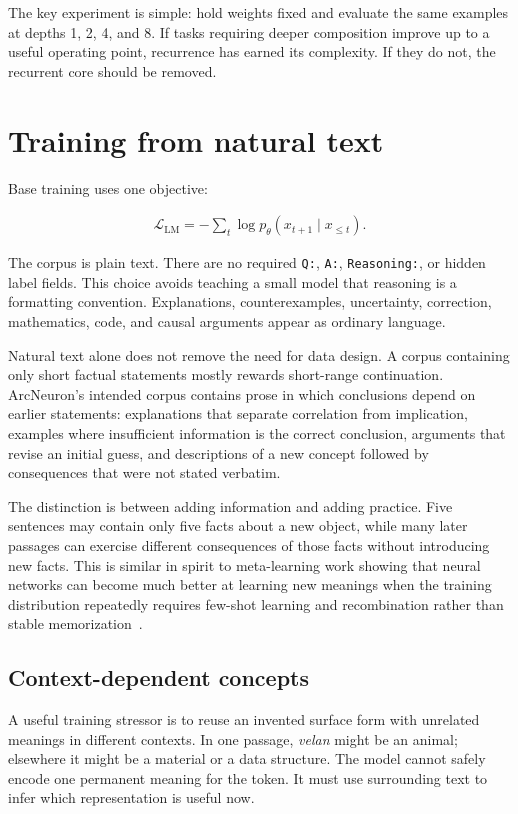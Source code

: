 \documentclass[10pt]{article}
\begin{document}
The key experiment is simple: hold weights fixed and evaluate the same examples at depths 1, 2, 4, and 8. If tasks requiring deeper composition improve up to a useful operating point, recurrence has earned its complexity. If they do not, the recurrent core should be removed.

\section{Training from natural text}

Base training uses one objective:

\begin{align}
    \mathcal{L}_{\mathrm{LM}} = -\sum_t \log p_\theta(x_{t+1}\mid x_{\le t}).
\end{align}

The corpus is plain text. There are no required \texttt{Q:}, \texttt{A:}, \texttt{Reasoning:}, or hidden label fields. This choice avoids teaching a small model that reasoning is a formatting convention. Explanations, counterexamples, uncertainty, correction, mathematics, code, and causal arguments appear as ordinary language.

Natural text alone does not remove the need for data design. A corpus containing only short factual statements mostly rewards short-range continuation. ArcNeuron's intended corpus contains prose in which conclusions depend on earlier statements: explanations that separate correlation from implication, examples where insufficient information is the correct conclusion, arguments that revise an initial guess, and descriptions of a new concept followed by consequences that were not stated verbatim.

The distinction is between adding information and adding practice. Five sentences may contain only five facts about a new object, while many later passages can exercise different consequences of those facts without introducing new facts. This is similar in spirit to meta-learning work showing that neural networks can become much better at learning new meanings when the training distribution repeatedly requires few-shot learning and recombination rather than stable memorization~\cite{lake2023mlc,wang2025minnow}.

\subsection{Context-dependent concepts}

A useful training stressor is to reuse an invented surface form with unrelated meanings in different contexts. In one passage, \emph{velan} might be an animal; elsewhere it might be a material or a data structure. The model cannot safely encode one permanent meaning for the token. It must use surrounding text to infer which representation is useful now.
\end{document}
